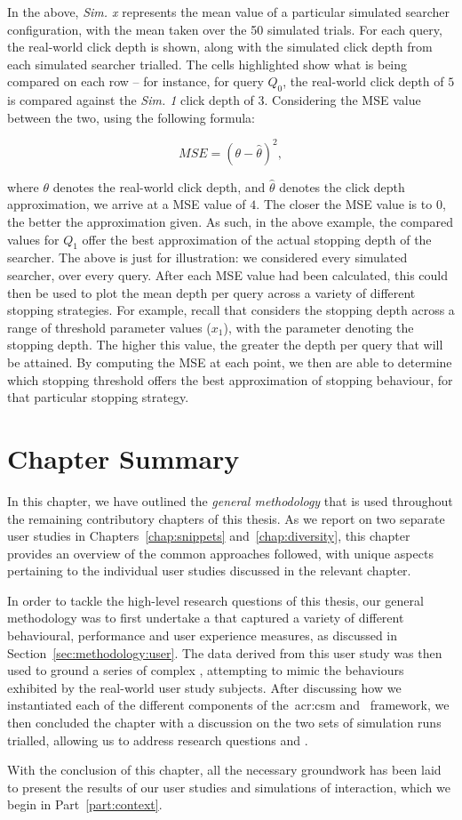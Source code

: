 In the above, \emph{Sim. x} represents the mean value of a particular simulated searcher configuration, with the mean taken over the 50 simulated trials. For each query, the real-world click depth is shown, along with the simulated click depth from each simulated searcher trialled. The cells highlighted show what is being compared on each row -- for instance, for query $Q_0$, the real-world click depth of $5$ is compared against the \emph{Sim. 1} click depth of $3$. Considering the MSE value between the two, using the following formula:

\vspace*{-4mm}
\begin{equation*}
MSE = (\theta - \hat{\theta})^{2},
\end{equation*}

where $\theta$ denotes the real-world click depth, and $\hat{\theta}$ denotes the click depth approximation, we arrive at a MSE value of $4$. The closer the MSE value is to $0$, the better the approximation given. As such, in the above example, the compared values for $Q_1$ offer the best approximation of the actual stopping depth of the searcher. The above is just for illustration: we considered every simulated searcher, over every query. After each MSE value had been calculated, this could then be used to plot the mean depth per query across a variety of different stopping strategies. For example, recall that  considers the stopping depth across a range of threshold parameter values ($x_1$), with the parameter denoting the stopping depth. The higher this value, the greater the depth per query that will be attained. By computing the MSE at each point, we then are able to determine which stopping threshold offers the best approximation of stopping behaviour, for that particular stopping strategy.

\section{Chapter Summary}
In this chapter, we have outlined the \emph{general methodology} that is used throughout the remaining contributory chapters of this thesis. As we report on two separate user studies in Chapters~\ref{chap:snippets} and~\ref{chap:diversity}, this chapter provides an overview of the common approaches followed, with unique aspects pertaining to the individual user studies discussed in the relevant chapter.

In order to tackle the high-level research questions of this thesis, our general methodology was to first undertake a  that captured a variety of different behavioural, performance and user experience measures, as discussed in Section~\ref{sec:methodology:user}. The data derived from this user study was then used to ground a series of complex , attempting to mimic the behaviours exhibited by the real-world user study subjects. After discussing how we instantiated each of the different components of the~\gls{acr:csm} and \simiir~framework, we then concluded the chapter with a discussion on the two sets of simulation runs trialled, allowing us to address research questions  and .

With the conclusion of this chapter, all the necessary groundwork has been laid to present the results of our user studies and simulations of interaction, which we begin in Part~\ref{part:context}.